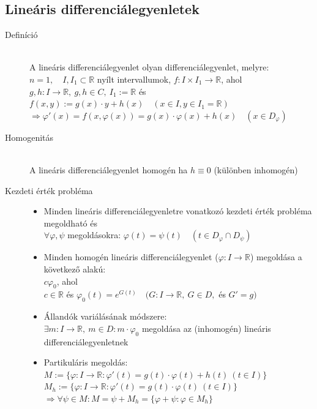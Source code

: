 \documentclass[margin=0px]{article}
\newcommand{\R}{\mathbb{R}}
\begin{document}
		\subsection{Lineáris differenciálegyenletek}
			\begin{description}
				\item[Definíció] \hfill \\
				A lineáris differenciálegyenlet olyan differenciálegyenlet, melyre:\\
					$ n=1, \quad I,I_1 \subset \R $ nyílt intervallumok, $f:I\times I_1 \rightarrow \R$, ahol \\
					$g,h : I \rightarrow \R, \ g,h \in C, \ I_1 := \R$ és \\
					$f(x,y) := g(x)\cdot y + h(x) \quad (x \in I, y \in I_1 = \R) $\\
					$ \Rightarrow \varphi'(x) = f(x, \varphi(x)) = g(x) \cdot \varphi(x) + h(x) \quad (x \in D_{\varphi})$
				\item[Homogenitás] \hfill \\
					A lineáris differenciálegyenlet homogén ha $ h \equiv 0$ (különben inhomogén)
				\item[Kezdeti érték probléma] \hfill
				\begin{itemize}
					\item Minden lineáris differenciálegyenletre vonatkozó kezdeti érték probléma megoldható és \\ 
					$\forall \varphi, \psi $ megoldásokra: $ \varphi(t) = \psi(t) \quad (t \in D_{\varphi} \cap D_{\psi} )$
					\item Minden homogén lineáris differenciálegyenlet ($\varphi : I \rightarrow \R$) megoldása a következő alakú: \\
					$ c\varphi_0$, ahol \\
					 $c \in \R$ és $\varphi_0(t) = e^{G(t)} \quad (G:I\rightarrow\R, \ G \in D, $ és $ G' = g)$
					\item Állandók variálásának módszere:\\
					$ \exists m:I\rightarrow\R, \ m \in D : m\cdot\varphi_0$ megoldása az (inhomogén) lineáris differenciálegyenletnek
					\item Partikuláris megoldás: \\
					$M := \{ \varphi : I \rightarrow \R : \varphi'(t) = g(t)\cdot\varphi(t) + h(t) \ (t \in I)\} $ \\
					$M_h := \{ \varphi : I \rightarrow \R : \varphi'(t) = g(t)\cdot\varphi(t) \ (t \in I)\} $\\
					$\Rightarrow \forall \psi \in M : M = \psi + M_h = \{\varphi + \psi : \varphi \in M_h\}$\\

\end{itemize}
\end{description}
\end{document}
